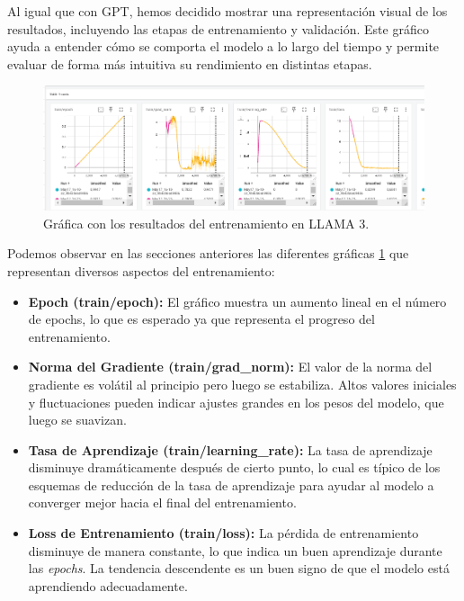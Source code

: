 \bigskip %

Al igual que con \acrshort{GPT}, hemos decidido mostrar una representación visual de los resultados, incluyendo las etapas de entrenamiento y validación. Este gráfico ayuda a entender cómo se comporta el modelo a lo largo del tiempo y permite evaluar de forma más intuitiva su rendimiento en distintas etapas.

\bigskip %

\begin{figure}[htbp!]
  \centering
  \includegraphics[width=\textwidth,keepaspectratio]{imaxes/5_LLAMA_Graficos_Train.png}
  \caption{Gráfica con los resultados del entrenamiento en LLAMA 3.}
  \label{fig:5_LLAMA_Graficos_Train.png}
\end{figure}

\bigskip %

Podemos observar en las secciones anteriores las diferentes gráficas \ref{fig:5_LLAMA_Graficos_Train.png} que representan diversos aspectos del entrenamiento:

\begin{itemize}
    \item \textbf{Epoch (train/epoch):} El gráfico muestra un aumento lineal en el número de epochs, lo que es esperado ya que representa el progreso del entrenamiento.

    \item \textbf{Norma del Gradiente (train/grad\_norm):} El valor de la norma del gradiente es volátil al principio pero luego se estabiliza. Altos valores iniciales y fluctuaciones pueden indicar ajustes grandes en los pesos del modelo, que luego se suavizan.

    \item \textbf{Tasa de Aprendizaje (train/learning\_rate):} La tasa de aprendizaje disminuye dramáticamente después de cierto punto, lo cual es típico de los esquemas de reducción de la tasa de aprendizaje para ayudar al modelo a converger mejor hacia el final del entrenamiento.

    \item \textbf{Loss de Entrenamiento (train/loss):} La pérdida de entrenamiento disminuye de manera constante, lo que indica un buen aprendizaje durante las \textit{epochs}. La tendencia descendente es un buen signo de que el modelo está aprendiendo adecuadamente.
\end{itemize}


